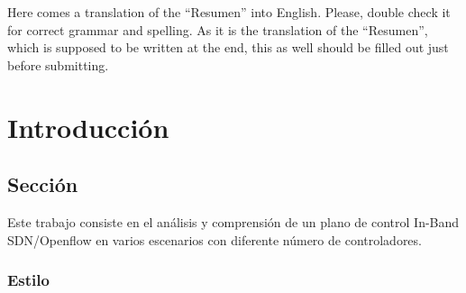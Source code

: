 \documentclass[a4paper, 12pt]{book}
\begin{document}
	Here comes a translation of the ``Resumen'' into English. 
	Please, double check it for correct grammar and spelling.
	As it is the translation of the ``Resumen'', which is supposed to be written at the end, this as well should be filled out just before submitting.
	
	
	
	
	\tableofcontents 
	\cleardoublepage
	\listoffigures %
	
	
	
	\cleardoublepage
	\chapter{Introducción}
	\label{sec:intro} %
	
	
	
	
	\section{Sección}
	\label{sec:seccion}
	
	Este trabajo consiste en el análisis y comprensión de un plano de control In-Band SDN/Openflow en varios escenarios con diferente número de controladores.
	
	\subsection{Estilo}
	\label{subsec:estilo}
	
\end{document}
